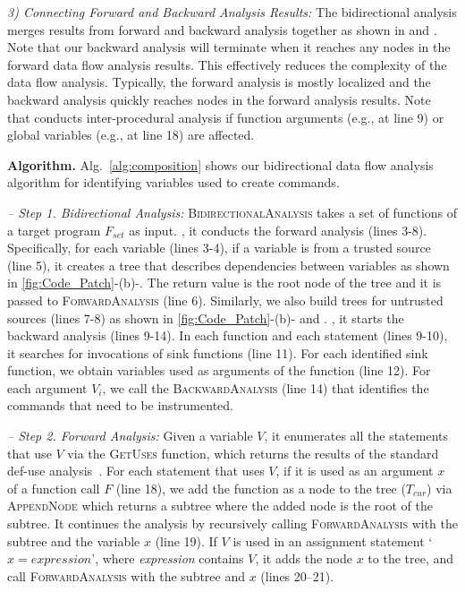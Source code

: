 {\it 3) Connecting Forward and Backward Analysis Results:}
The bidirectional analysis merges results from forward and backward analysis together as shown in  and . %
Note that our backward analysis will terminate when it reaches any nodes in the forward data flow analysis results. 
This effectively reduces the complexity of the data flow analysis. 
Typically, the forward analysis is mostly localized and the backward analysis quickly reaches nodes in the forward analysis results.
Note that \sysname conducts inter-procedural analysis if function arguments (e.g.,  at line 9) or global variables (e.g.,  at line 18) are affected.









\smallskip
\noindent
{\bf Algorithm.} 
Alg.~\ref{alg:composition} shows our bidirectional data flow analysis algorithm for identifying variables used to create commands. 

\noindent
{\it -- Step 1. Bidirectional Analysis:} 
\textsc{BidirectionalAnalysis} takes a set of functions of a target program $F_\mathit{set}$ as input. 
%
, it conducts the forward analysis (lines 3-8). Specifically, for each variable (lines 3-4), if a variable is from a trusted source (line 5), it creates a tree that describes dependencies between variables as shown in \autoref{fig:Code_Patch}-(b)-. The return value is the root node of the tree and it is passed to \textsc{ForwardAnalysis} (line 6).
Similarly, we also build trees for untrusted sources (lines 7-8) as shown in \autoref{fig:Code_Patch}-(b)- and .
%
, it starts the backward analysis (lines 9-14). 
In each function and each statement (lines 9-10), it searches for invocations of sink functions (line 11). For each identified sink function, we obtain variables used as arguments of the function (line 12).
For each argument $V_i$, we call the \textsc{BackwardAnalysis}  (line 14) that identifies the commands that need to be instrumented.

\noindent
{\it -- Step 2. Forward Analysis:}
Given a variable $V$, it enumerates all the statements that use $V$ via the \textsc{GetUses} function, which returns the results of the standard def-use analysis~\cite{defusechain, defuse2}.
For each statement that uses $V$, if it is used as an argument $x$ of a function call $F$ (line 18), we add the function as a node to the tree ($T_\textit{cur}$) via \textsc{AppendNode} which returns a subtree where the added node is the root of the subtree. It continues the analysis by recursively calling \textsc{ForwardAnalysis} with the subtree and the variable $x$ (line 19).
If $V$ is used in an assignment statement `$x = \textit{expression}$', where \textit{expression} contains $V$, it adds the node $x$ to the tree, and call \textsc{ForwardAnalysis} with the subtree and $x$ (lines 20--21).


